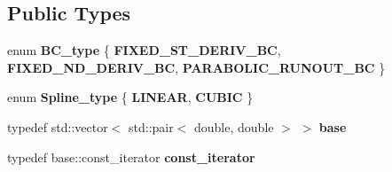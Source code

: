 \subsection*{Public Types}
\begin{DoxyCompactItemize}
\item 
\mbox{\label{classSpline_a704c277763b2964f7f5f25182a899c67}} 
enum {\bfseries B\+C\+\_\+type} \{ {\bfseries F\+I\+X\+E\+D\+\_\+S\+T\+\_\+\+D\+E\+R\+I\+V\+\_\+\+BC}, 
{\bfseries F\+I\+X\+E\+D\+\_\+N\+D\+\_\+\+D\+E\+R\+I\+V\+\_\+\+BC}, 
{\bfseries P\+A\+R\+A\+B\+O\+L\+I\+C\+\_\+\+R\+U\+N\+O\+U\+T\+\_\+\+BC}
 \}
\item 
\mbox{\label{classSpline_a3a0db96d6cbd6b8cba39d2af34430441}} 
enum {\bfseries Spline\+\_\+type} \{ {\bfseries L\+I\+N\+E\+AR}, 
{\bfseries C\+U\+B\+IC}
 \}
\item 
\mbox{\label{classSpline_acdb506f5777af7c0370d996f86dcbb60}} 
typedef std\+::vector$<$ std\+::pair$<$ double, double $>$ $>$ {\bfseries base}
\item 
\mbox{\label{classSpline_a43427ab2dd2ca375579742b6ef0afb31}} 
typedef base\+::const\+\_\+iterator {\bfseries const\+\_\+iterator}
\end{DoxyCompactItemize}
